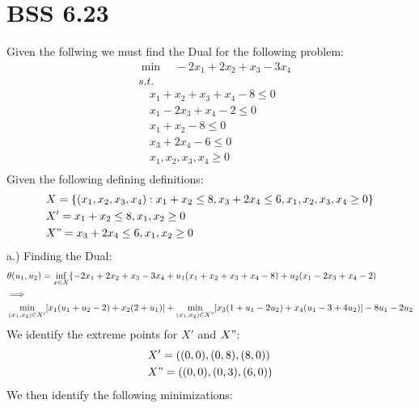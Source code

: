 \documentclass[12pt]{article}
\begin{document}
\section{BSS 6.23} 
    Given the follwing we must find the Dual for the following problem: \\
        \begin{align*}
            &\min \quad -2x_1 + 2x_2 + x_3 - 3x_4\\
            &s.t.\\
            &\quad x_1 + x_2 +x_3 + x_4 -8 \leq 0 \\
            &\quad x_1 -2x_3 + x_4 -2 \leq 0\\
            &\quad x_1 + x_2 - 8 \leq 0\\
            &\quad x_3 + 2x_4 -6 \leq 0 \\
            &\quad x_1, x_2, x_3, x_4 \geq 0\\
        \end{align*}
    Given the following defining definitions:\\
        \begin{align*}
            &X = \{(x_1,x_2,x_3,x_4) : x_1 + x_2 \leq 8, x_3 + 2x_4 \leq 6,x_1,x_2,x_3,x_4 \geq 0 \}\\
            &X' =  x_1 + x_2 \leq 8 , x_1,x_2 \geq 0 \\ 
            &X" = x_3 + 2x_4 \leq 6, x_1,x_2 \geq 0 \\
        \end{align*}
    a.) Finding the Dual:\\
        \begin{align*}
            &\theta(u_1,u_2) = \inf_{x \in X} \{-2x_1 + 2x_2 + x_3 - 3x_4 + u_1 (x_1 + x_2 +x_3 + x_4 -8) + u_2 (x_1 -2x_3 + x_4 -2)\\
            &\Longrightarrow\\
            &\min_{(x_1,x_2) \in X'}[ x_1(u_1 + u_2 -2) + x_2 (2+u_1)] + \min_{(x_1,x_2) \in X"} [x_3 (1 + u_1 - 2u_2) + x_4 (u_1 - 3 + 4 u_2)] -8u_1 -2u_2\\
        \end{align*}
    We identify the extreme points for $X'$ and $X"$:\\
        \begin{align*}
            &X' = ((0,0), (0,8) , (8,0))\\
            &X" = ((0,0) , (0,3), (6,0))\\
        \end{align*}
    We then identify the following minimizations:
\end{document}
